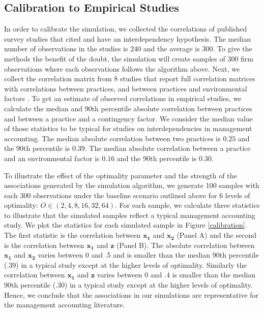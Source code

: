 \documentclass[12pt]{article}
\begin{document}
\subsection{Calibration to Empirical Studies}\label{optimality}

In order to calibrate the simulation, we collected the correlations of published survey studies that cited \citet{grabner_management_2013} and have an interdependency hypothesis. The median number of observations in the studies is 240 and the average is 300. To give the methods the benefit of the doubt, the simulation will create samples of 300 firm observations where each observations follows the algorithm above. Next, we collect the correlation matrix from 8 studies that report full correlation matrices with correlations between practices, and between practices and environmental factors \citep{dekker_collaborative_2016, grabner_cost_2016, bedford_configurations_2015, heinicke_examination_2016, bedford_performance_2019, abernethy_are_2015, sponem_exploring_2016, samagaio_management_2018}. To get an estimate of observed correlations in empirical studies, we calculate the median and 90th percentile absolute correlation between practices and between a practice and a contingency factor. We consider the median value of those statistics to be typical for studies on interdependencies in management accounting. The median absolute correlation between two practices is $0.25$ and the 90th percentile is $0.39$. The median absolute correlation between a practice and an environmental factor is $0.16$ and the 90th percentile is $0.30$.

To illustrate the effect of the optimality parameter and the strength of the associations generated by the simulation algorithm, we generate 100 samples with each 300 observations under the baseline scenario outlined above for 6 levels of optimality: $O \in  (2, 4, 8, 16, 32, 64)$. For each sample, we calculate three statistics to illustrate that the simulated samples reflect a typical management accounting study. We plot the statistics for each simulated sample in Figure \ref{calibration}. The first statistic is the correlation between $\mathbf{x_1}$ and $\mathbf{x_2}$ (Panel A) and the second is the correlation between $\mathbf{x_1}$ and $\mathbf{z}$ (Panel B). The absolute correlation between $\mathbf{x_1}$ and $\mathbf{x_2}$ varies between 0 and .5 and is smaller than the median 90th percentile ($.39$) in a typical study except at the higher levels of optimality. Similarly the correlation between $\mathbf{x_1}$ and $\mathbf{z}$ varies between 0 and .4 is smaller than the median 90th percentile (.30) in a typical study except at the higher levels of optimality. Hence, we conclude that the associations in our simulations are representative for the management accounting literature. 
\end{document}
